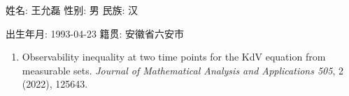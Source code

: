 


姓名: 王允磊 \quad 性别: 男 \quad 民族: 汉 

出生年月: 1993-04-23 \quad 籍贯: 安徽省六安市


    \begin{enumerate}
        \item Observability inequality at two time points for the KdV equation from measurable sets. \textit{Journal of Mathematical Analysis and Applications 505}, 2 (2022), 125643.
    \end{enumerate}

\iffalse \cugauthorcvsection{获奖、专利情况}
    \begin{enumerate}
        \item X.X. 江苏省科技进步奖三等奖. 排名第二; (ps: 逗我呢?)
        \item \dots
    \end{enumerate}

\cugauthorcvsection{研究项目}
    \begin{enumerate}
        \item X 项目, 国家自然基金, 项目编号: XXX, 参加人员;
        \item \dots
    \end{enumerate}
    \fi

\endinput
